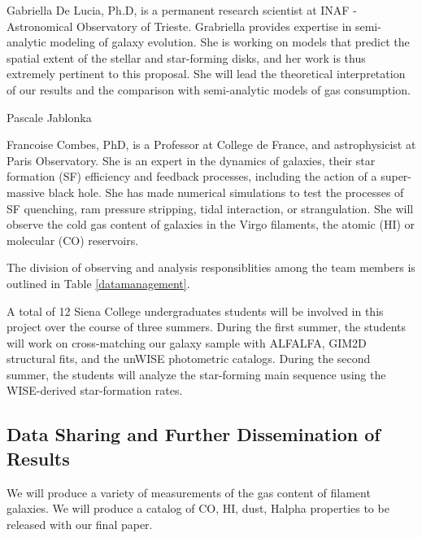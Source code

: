 \documentclass[12pt, preprint]{aastex}
\begin{document}
{Gabriella De Lucia, Ph.D, is a permanent research scientist at INAF -
Astronomical Observatory of Trieste.  Grabriella provides expertise in
semi-analytic modeling of galaxy evolution. She is working on models
that predict the spatial extent of the stellar and star-forming disks,
and her work is thus extremely pertinent to this proposal.  She will lead
the theoretical interpretation of our results and the comparison
with semi-analytic models of gas consumption.

Pascale Jablonka


Francoise Combes, PhD, is a Professor at College de France, and astrophysicist at Paris Observatory. She is an expert in the dynamics of galaxies, their star formation (SF) efficiency and feedback processes, including the action of a super-massive black hole. She has made numerical simulations to test the processes of SF quenching, ram pressure stripping, tidal interaction, or strangulation. She will observe the cold gas content of galaxies in the Virgo filaments, the atomic (HI) or molecular (CO) reservoirs.

The division of observing and analysis responsiblities among the team
members is outlined in Table \ref{datamanagement}. 


A total of 12 Siena College undergraduates students will be involved
in this project over the course of three summers.  During the first
summer, the students will work on cross-matching our galaxy sample
with ALFALFA, GIM2D structural fits, and the unWISE photometric catalogs.  During the second summer, the
students will analyze the star-forming main sequence using the
WISE-derived star-formation rates.

%


\vspace*{-.8cm}\subsection{Data Sharing and Further Dissemination of Results }
\vspace*{-.3cm}
We will produce a variety of measurements of the gas content of
filament galaxies.  We will produce a catalog of CO, HI, dust, Halpha
properties to be released with our final paper.

}
\end{document}
